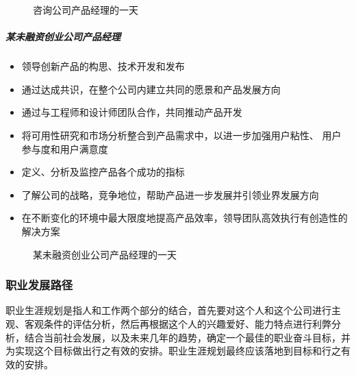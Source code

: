 \documentclass[letterpaper,10pt,english]{sphinxmanual}
\begin{document}
\begin{figure}[H]
\centering
\capstart

\noindent{}
\caption{咨询公司产品经理的一天}\label{\detokenize{chapter_introduction/1Day:id10}}\end{figure}


\subparagraph{某未融资创业公司产品经理}
\label{\detokenize{chapter_introduction/1Day:id7}}\begin{itemize}
\item {} 
领导创新产品的构思、技术开发和发布

\item {} 
通过达成共识，在整个公司内建立共同的愿景和产品发展方向

\item {} 
通过与工程师和设计师团队合作，共同推动产品开发

\item {} 
将可用性研究和市场分析整合到产品需求中，以进一步加强用户粘性、
用户参与度和用户满意度

\item {} 
定义、分析及监控产品各个成功的指标

\item {} 
了解公司的战略，竞争地位，帮助产品进一步发展并引领业界发展方向

\item {} 
在不断变化的环境中最大限度地提高产品效率，领导团队高效执行有创造性的解决方案

\end{itemize}

\begin{figure}[H]
\centering
\capstart

\noindent{}
\caption{某未融资创业公司产品经理的一天}\label{\detokenize{chapter_introduction/1Day:id11}}\end{figure}


\subsubsection{职业发展路径}
\label{\detokenize{chapter_introduction/career_path:id1}}\label{\detokenize{chapter_introduction/career_path::doc}}
职业生涯规划是指人和工作两个部分的结合，首先要对这个人和这个公司进行主观、客观条件的评估分析，然后再根据这个人的兴趣爱好、能力特点进行利弊分析，结合当前社会发展，以及未来几年的趋势，确定一个最佳的职业奋斗目标，并为实现这个目标做出行之有效的安排。职业生涯规划最终应该落地到目标和行之有效的安排。
\end{document}
